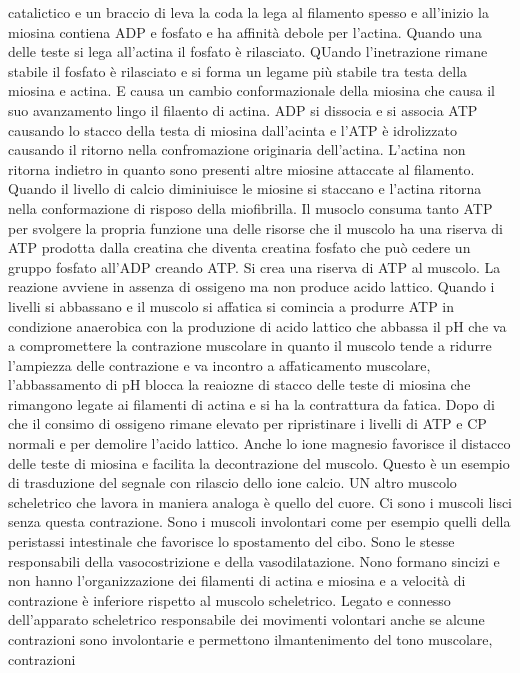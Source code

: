 catalictico e un braccio di leva la coda la lega al filamento spesso e all'inizio la miosina contiena ADP e fosfato e ha affinit\`a debole per l'actina. Quando una delle teste si lega 
all'actina il fosfato \`e rilasciato. QUando l'inetrazione rimane stabile il fosfato \`e rilasciato e si forma un legame pi\`u stabile tra testa della miosina e actina. E causa un
cambio conformazionale della miosina che causa il suo avanzamento lingo il filaento di actina. ADP si dissocia e si associa ATP causando lo stacco della testa di miosina dall'acinta
e l'ATP \`e idrolizzato causando il ritorno nella confromazione originaria dell'actina. L'actina non ritorna indietro in quanto sono presenti altre miosine attaccate al filamento. Quando 
il livello di calcio diminiuisce le miosine si staccano e l'actina ritorna nella conformazione di risposo della miofibrilla. Il musoclo consuma tanto ATP per svolgere la propria funzione
una delle risorse che il muscolo ha una riserva di ATP prodotta dalla creatina che diventa creatina fosfato che pu\`o cedere un gruppo fosfato all'ADP creando ATP. Si crea una riserva di 
ATP al muscolo. La reazione avviene in assenza di ossigeno ma non produce acido lattico. Quando i livelli si abbassano e il muscolo si affatica si comincia a produrre ATP in condizione
anaerobica con la produzione di acido lattico che abbassa il pH che va a compromettere la contrazione muscolare in quanto il muscolo tende a ridurre l'ampiezza delle contrazione e va
incontro a affaticamento muscolare, l'abbassamento di pH blocca la reaiozne di stacco delle teste di miosina che rimangono legate ai filamenti di actina e si ha la contrattura da
fatica. Dopo di che il consimo di ossigeno rimane elevato per ripristinare i livelli di ATP e CP normali e per demolire l'acido lattico. Anche lo ione magnesio favorisce il distacco
delle teste di miosina e facilita la decontrazione del muscolo. Questo \`e un esempio di trasduzione del segnale con rilascio dello ione calcio. UN altro muscolo scheletrico che 
lavora in maniera analoga \`e quello del cuore. Ci sono i muscoli lisci senza questa contrazione. Sono i muscoli involontari come per esempio quelli della peristassi intestinale che
favorisce lo spostamento del cibo. Sono le stesse responsabili della vasocostrizione e della vasodilatazione. Nono formano sincizi e non hanno l'organizzazione dei filamenti di 
actina e miosina e a velocit\`a di contrazione \`e inferiore rispetto al muscolo scheletrico. 
Legato e connesso dell'apparato scheletrico responsabile dei movimenti volontari anche se alcune contrazioni sono involontarie e permettono ilmantenimento del tono muscolare, contrazioni
